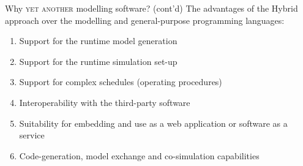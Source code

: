 \documentclass[compress,newPxFont,sthlmFooter]{beamer}
\begin{document}
\begin{frame}{Why \textsc{yet another} modelling software? (cont'd)}
  The advantages of the \alert{Hybrid} approach over the \alert{modelling} and \alert{general-purpose} programming languages:
    \begin{enumerate}
        \item Support for the \alert{runtime model generation}
        \item Support for the \alert{runtime simulation set-up}
        \item Support for \alert{complex schedules} (operating procedures)
        \item \alert{Interoperability} with the \alert{third-party software}
        \item Suitability for \alert{embedding} and use as a \alert{web application} or \alert{software as a service}
        \item \alert{Code-generation}, \alert{model exchange} and \alert{co-simulation} capabilities  
    \end{enumerate}
\end{frame}
% 
%     
\end{document}
